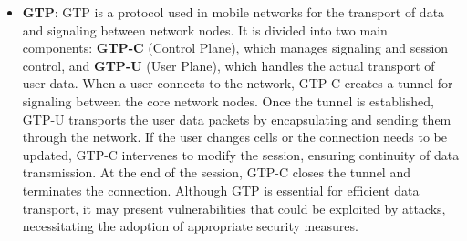 \documentclass[english]{article}
\begin{document}
\begin{itemize}
	\item \textbf{\hypertarget{GTP}{GTP}}:
	      GTP is a protocol used in mobile networks for the transport of data and signaling
	      between network nodes. It is divided into two main components:
	      \textbf{GTP-C} (Control Plane), which manages signaling and session control,
	      and \textbf{GTP-U} (User Plane), which handles the actual transport of user data.
	      When a user connects to the network, GTP-C creates a tunnel for signaling between
	      the core network nodes. Once the tunnel is established, GTP-U transports the user
	      data packets by encapsulating and sending them through the network. If the user
	      changes cells or the connection needs to be updated, GTP-C intervenes to modify
	      the session, ensuring continuity of data transmission. At the end of the session,
	      GTP-C closes the tunnel and terminates the connection. Although GTP is essential
	      for efficient data transport, it may present vulnerabilities that could be exploited
	      by attacks, necessitating the adoption of appropriate security measures.


\end{itemize}
\end{document}
